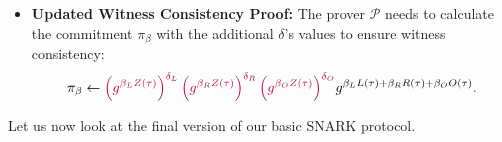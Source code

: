 \documentclass[../lecture-notes.tex]{subfiles}
\begin{document}
\begin{proposition}
\begin{itemize}
\begin{equation*}
        \end{equation*}
        \item \textbf{Updated Witness Consistency Proof:} The prover $\mathcal{P}$ needs to calculate the commitment $\pi_{\beta}$ with the additional $\delta$'s values to ensure witness consistency:
        \begin{equation*}
            \pi_{\beta} \gets \textcolor{purple}{\left(g^{\beta_L Z(\tau)}\right)^{\delta_L}\left(g^{\beta_R Z(\tau)}\right)^{\delta_R}\left(g^{\beta_O Z(\tau)}\right)^{\delta_O}}g^{\beta_LL(\tau) + \beta_RR(\tau) + \beta_OO(\tau)}.
        \end{equation*}
    \end{itemize}
\end{proposition}

Let us now look at the final version of our basic SNARK protocol.
\end{document}
